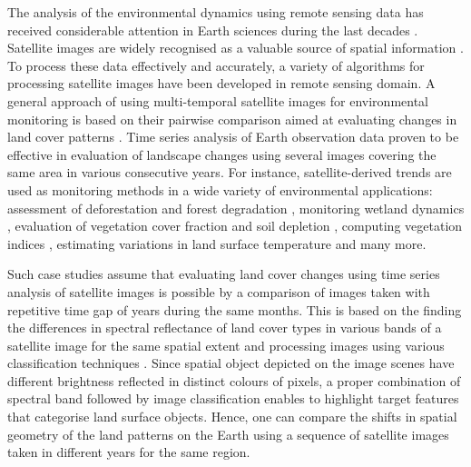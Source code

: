 \documentclass[12pt,a4paper,oneside]{article}
\def \newpar{\vspace{6pt}}
\begin{document}
\newpar The analysis of the environmental dynamics using remote sensing data has received considerable attention in Earth sciences during the last decades \citep{SULTANA2023267,PAYRA2023239,MERTIKAS2021107}. Satellite images are widely recognised as a valuable source of spatial information \citep{Richards,Costel,Lerat}. To process these data effectively and accurately, a variety of algorithms for processing satellite images have been developed in remote sensing domain. A general approach of using multi-temporal satellite images for environmental monitoring is based on their pairwise comparison aimed at evaluating changes in land cover patterns \citep{OGILVIE2015368,Hiernaux}. Time series analysis of Earth observation data proven to be effective in evaluation of landscape changes using several images covering the same area in various consecutive years. For instance, satellite-derived trends are used as monitoring methods in a wide variety of environmental applications: assessment of deforestation and forest degradation \citep{MASOLELE2021112600,rs11242999,ijgi11110573,rs9090905}, monitoring wetland dynamics \citep{KOVACS2022113267,land11122137}, evaluation of vegetation cover fraction and soil depletion \cite{DUBE2017112,rs15010020}, computing vegetation indices \citep{VENTER2020106206,app122412554,f13122066}, estimating variations in land surface temperature \citep{CARRILLONIQUETE2022104280} and many more. 

\newpar Such case studies assume that evaluating land cover changes using time series analysis of satellite images is possible by a comparison of images taken with repetitive time gap of years during the same months. This is based on the finding the differences in spectral reflectance of land cover types in various bands of a satellite image for the same spatial extent and processing images using various classification techniques \citep{SHAHI202385,MERRY2023269,GANDHI201681}. Since spatial object depicted on the image scenes have different brightness reflected in distinct colours of pixels, a proper combination of spectral band followed by image classification enables to highlight target features that categorise land surface objects. Hence, one can compare the shifts in spatial geometry of the land patterns on the Earth using a sequence of satellite images taken in different years for the same region. 
\end{document}
